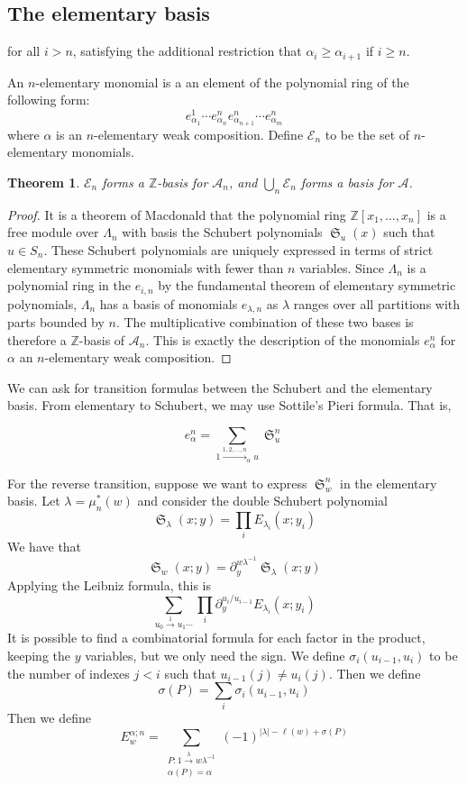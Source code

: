 \documentclass{amsart}
\newtheorem{theorem}{Theorem}[section]
\theoremstyle{definition}
\theoremstyle{remark}
\numberwithin{equation}{subsection}
\DeclareMathOperator{\sch}{\mathfrak{S}}
\newcommand{\coma}{\mathcal{A}}
\begin{document}
\newcommand{\sdom}{\widetilde{\mu}}


\subsection{The elementary basis}

for all $i>n$, satisfying the additional restriction that $\alpha_i\geq \alpha_{i+1}$ if $i\geq n$.

An $n$-elementary monomial is a an element of the polynomial ring of the following form: 
$$e_{\alpha_1}^{1}\cdots e_{\alpha_n}^ne_{\alpha_{n+1}}^n\cdots e_{\alpha_m}^n$$
where $\alpha$ is an $n$-elementary weak composition. Define $\mathcal{E}_n$ to be the set of $n$-elementary monomials.

\begin{theorem}
	$\mathcal{E}_n$ forms a $\mathbb{Z}$-basis for $\coma_n$, and $\bigcup_{n}\mathcal{E}_n$ forms a basis for $\coma$.
\end{theorem}
\begin{proof}
	It is a theorem of Macdonald that the polynomial ring $\mathbb{Z}[x_1,\ldots,x_n]$ is a free module over $\Lambda_n$ with basis the Schubert polynomials $\sch_u(x)$ such that $u\in S_n$. These Schubert polynomials are uniquely expressed in terms of strict elementary symmetric monomials with fewer than $n$ variables. Since $\Lambda_n$ is a polynomial ring in the $e_{i,n}$ by the fundamental theorem of elementary symmetric polynomials, $\Lambda_n$ has a basis of monomials $e_{\lambda,n}$ as $\lambda$ ranges over all partitions with parts bounded by $n$. The multiplicative combination of these two bases is therefore a $\mathbb{Z}$-basis of $\coma_n$. This is exactly the description of the monomials $e_{\alpha}^n$ for $\alpha$ an $n$-elementary weak composition.
\end{proof}

We can ask for transition formulas between the Schubert and the elementary basis. From elementary to Schubert, we may use Sottile's Pieri formula. That is,

$$e_{\alpha}^n = \sum_{1\xrightarrow{1,2,\ldots,n}_{\alpha} u}\sch_u^n$$

For the reverse transition, suppose we want to express $\sch_w^n$ in the elementary basis. Let $\lambda = \mu^*_n(w)$ and consider the double Schubert polynomial
$$\sch_{\lambda}(x;y)=\prod_i E_{\lambda_i}(x;y_i)$$
We have that
$$\sch_w(x;y) = \partial_y^{w\lambda^{-1}}\sch_\lambda(x;y)$$
Applying the Leibniz formula, this is
$$\sum_{u_0\xrightarrow{1} u_1\cdots}\prod_i \partial^{u_i/u_{i-1}}_yE_{\lambda_i}(x;y_i)$$
It is possible to find a combinatorial formula for each factor in the product, keeping the $y$ variables, but we only need the sign. We define $\sigma_i(u_{i-1},u_i)$ to be the number of indexes $j<i$ such that $u_{i-1}(j)\neq u_i(j)$. Then we define
$$\sigma(P)=\sum_i \sigma_i(u_{i-1},u_i)$$
Then we define
$$E^{\alpha;n}_w = \sum_{\substack{P:1\xrightarrow{\lambda} w\lambda^{-1}\\\alpha(P)=\alpha}}(-1)^{|\lambda|-\ell(w)+\sigma(P)}$$
\end{document}
